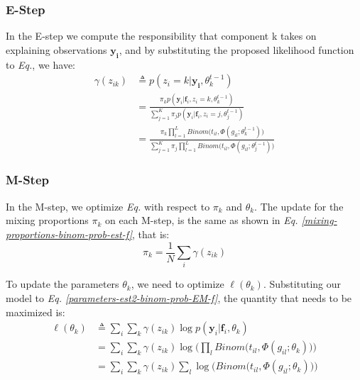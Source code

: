\subsubsection{E-Step}
In the E-step we compute the responsibility that component k takes on explaining observations $\mathbf{y_{i}}$, and by substituting the proposed likelihood function to \emph{Eq.}, we have:
\begin{equation} \label{responsibilities-binom-prob-model-f}
  \begin{split}
	\gamma(z_{ik}) & \triangleq p(z_{i}=k|\mathbf{y_{i}},\theta_{k}^{t-1}) \\
				   & = \frac{\pi_{k}p(\mathbf{y}_{i}|\mathbf{f}_{i},z_{i}=k,\theta_{k}^{t-1})}{\sum\limits_{j=1}^{K} \pi_{j}p(\mathbf{y}_{i}|\mathbf{f}_{i},z_{i}=j,\theta_{j}^{t-1})} \\
				   & = \frac{\pi_{k} \prod\limits_{l=1}^{L} Binom \big(t_{il}, \Phi(g_{il}; \theta_{k}^{t-1})\big)} {\sum\limits_{j=1}^{K} \pi_{j} \prod\limits_{l=1}^{L} Binom \big(t_{il}, \Phi(g_{il}; \theta_{j}^{t-1})\big)}
  \end{split}
\end{equation}

\subsubsection{M-Step}
In the M-step, we optimize \emph{Eq. } with respect to $\pi_{k}$ and $\theta_{k}$. The update for the mixing proportions $\pi_{k}$ on each M-step, is the same as shown in \emph{Eq. \ref{mixing-proportions-binom-prob-est-f}}, that is:
\begin{equation} \label{mixing-proportions-binom-prob-est-f}
		\pi_{k} = \frac{1}{N} \sum_{i} \gamma(z_{ik})
\end{equation}

To update the parameters $\theta_{k}$, we need to optimize $\ell(\theta_{k})$. Substituting our model to \emph{Eq. \ref{parameters-est2-binom-prob-EM-f}}, the quantity that needs to be maximized is:
\begin{equation} \label{parameters-est2-binom-prob-EM-f}
  \begin{split}
	\ell(\theta_{k}) & \triangleq \sum_{i} \sum_{k} \gamma(z_{ik}) \log p(\mathbf{y}_{i}|\mathbf{f}_{i}, \theta_{k}) \\
					 & = \sum_{i} \sum_{k} \gamma(z_{ik}) \log \bigg( \prod_{l} Binom \big(t_{il}, \Phi(g_{il}; \theta_{k})\big) \bigg)\\
					 & = \sum_{i} \sum_{k} \gamma(z_{ik}) \sum_{l} \log \bigg(Binom \big(t_{il}, \Phi(g_{il}; \theta_{k})\big) \bigg)
  \end{split}
\end{equation}

